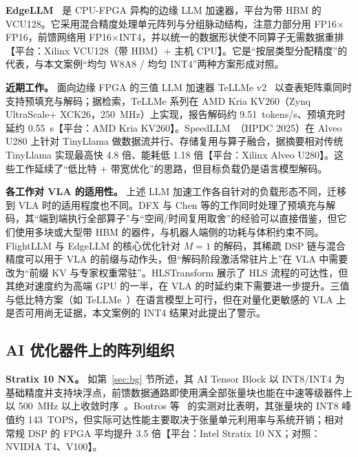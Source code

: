 \documentclass[a4paper,10.5pt]{ctexart}
\newcommand{\hw}[1]{\textsf{【平台：#1】}}
\begin{document}
\textbf{EdgeLLM~\cite{edgellm}} 是 CPU-FPGA 异构的边缘 LLM 加速器，平台为带 HBM 的 VCU128。它采用混合精度处理单元阵列与分组脉动结构，注意力部分用 FP16$\times$FP16，前馈网络用 FP16$\times$INT4，并以统一的数据形状使不同算子无需数据重排\hw{Xilinx VCU128（带 HBM）+ 主机 CPU}。它是“按层类型分配精度”的代表，与本文案例“均匀 W8A8 / 均匀 INT4”两种方案形成对照。

\textbf{近期工作。} 面向边缘 FPGA 的三值 LLM 加速器 TeLLMe v2~\cite{tellme} 以查表矩阵乘同时支持预填充与解码；据检索，TeLLMe 系列在 AMD Kria KV260（Zynq UltraScale+ XCK26，250~MHz）上实现，报告解码约 9.51~tokens/s、预填充时延约 0.55~s\hw{AMD Kria KV260}。SpeedLLM~\cite{speedllm}（HPDC 2025）在 Alveo U280 上针对 TinyLlama 做数据流并行、存储复用与算子融合，据摘要相对传统 TinyLlama 实现最高快 4.8 倍、能耗低 1.18 倍\hw{Xilinx Alveo U280}。这些工作延续了“低比特 + 带宽优化”的思路，但目标负载仍是语言模型解码。

\textbf{各工作对 VLA 的适用性。} 上述 LLM 加速工作各自针对的负载形态不同，迁移到 VLA 时的适用程度也不同。DFX 与 Chen 等的工作同时处理了预填充与解码，其“端到端执行全部算子”与“空间/时间复用取舍”的经验可以直接借鉴，但它们使用多块或大型带 HBM 的器件，与机器人端侧的功耗与体积约束不同。FlightLLM 与 EdgeLLM 的核心优化针对 $M=1$ 的解码，其稀疏 DSP 链与混合精度可以用于 VLA 的前缀与动作头，但“解码阶段激活常驻片上”在 VLA 中需要改为“前缀 KV 与专家权重常驻”。HLSTransform 展示了 HLS 流程的可达性，但其绝对速度约为高端 GPU 的一半，在 VLA 的时延约束下需要进一步提升。三值与低比特方案（如 TeLLMe~\cite{tellme}）在语言模型上可行，但在对量化更敏感的 VLA 上是否可用尚无证据，本文案例的 INT4 结果对此提出了警示。

\subsection{AI 优化器件上的阵列组织}

\textbf{Stratix 10 NX。} 如第~\ref{sec:bg} 节所述，其 AI Tensor Block 以 INT8/INT4 为基础精度并支持块浮点，前馈数据通路即使用满全部张量块也能在中速等级器件上以 500~MHz 以上收敛时序~\cite{s10nx_fpga21,s10nx_trets}。Boutros 等~\cite{s10nx_fpt} 的实测对比表明，其张量块的 INT8 峰值约 143~TOPS，但实际可达性能主要取决于张量单元利用率与系统开销；相对常规 DSP 的 FPGA 平均提升 3.5 倍\hw{Intel Stratix 10 NX；对照：NVIDIA T4、V100}。
\end{document}
